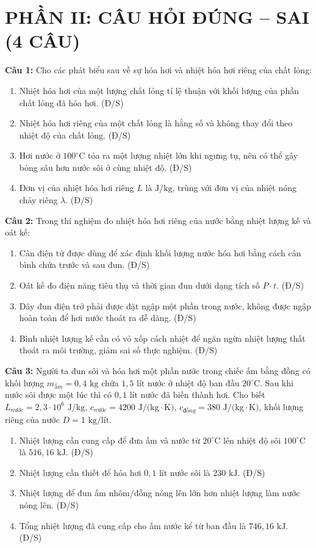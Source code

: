 \documentclass[12pt,a4paper]{article}
\begin{document}
\section*{PHẦN II: CÂU HỎI ĐÚNG -- SAI (4 CÂU)}

\textbf{Câu 1:} Cho các phát biểu sau về sự hóa hơi và nhiệt hóa hơi riêng của chất lỏng:
\begin{enumerate}[label=\alph*.]
  \item Nhiệt hóa hơi của một lượng chất lỏng tỉ lệ thuận với khối lượng của phần chất lỏng đã hóa hơi. \hfill (Đ/S)
  \item Nhiệt hóa hơi riêng của một chất lỏng là hằng số và không thay đổi theo nhiệt độ của chất lỏng. \hfill (Đ/S)
  \item Hơi nước ở $100^{\circ}\text{C}$ tỏa ra một lượng nhiệt lớn khi ngưng tụ, nên có thể gây bỏng sâu hơn nước sôi ở cùng nhiệt độ. \hfill (Đ/S)
  \item Đơn vị của nhiệt hóa hơi riêng $L$ là $\text{J/kg}$, trùng với đơn vị của nhiệt nóng chảy riêng $\lambda$. \hfill (Đ/S)
\end{enumerate}

\textbf{Câu 2:} Trong thí nghiệm đo nhiệt hóa hơi riêng của nước bằng nhiệt lượng kế và oát kế:
\begin{enumerate}[label=\alph*.]
  \item Cân điện tử được dùng để xác định khối lượng nước hóa hơi bằng cách cân bình chứa trước và sau đun. \hfill (Đ/S)
  \item Oát kế đo điện năng tiêu thụ và thời gian đun dưới dạng tích số $P \cdot t$. \hfill (Đ/S)
  \item Dây đun điện trở phải được đặt ngập một phần trong nước, không được ngập hoàn toàn để hơi nước thoát ra dễ dàng. \hfill (Đ/S)
  \item Bình nhiệt lượng kế cần có vỏ xốp cách nhiệt để ngăn ngừa nhiệt lượng thất thoát ra môi trường, giảm sai số thực nghiệm. \hfill (Đ/S)
\end{enumerate}

\textbf{Câu 3:} Người ta đun sôi và hóa hơi một phần nước trong chiếc ấm bằng đồng có khối lượng $m_{ấm} = 0{,}4\text{ kg}$ chứa $1{,}5\text{ lít}$ nước ở nhiệt độ ban đầu $20^{\circ}\text{C}$. Sau khi nước sôi được một lúc thì có $0{,}1\text{ lít}$ nước đã biến thành hơi. Cho biết $L_{nước} = 2{,}3 \cdot 10^6\text{ J/kg}$, $c_{nước} = 4200\text{ J/(kg}\cdot\text{K)}$, $c_{đồng} = 380\text{ J/(kg}\cdot\text{K)}$, khối lượng riêng của nước $D = 1\text{ kg/lít}$.
\begin{enumerate}[label=\alph*.]
  \item Nhiệt lượng cần cung cấp để đưa ấm và nước từ $20^{\circ}\text{C}$ lên nhiệt độ sôi $100^{\circ}\text{C}$ là $516{,}16\text{ kJ}$. \hfill (Đ/S)
  \item Nhiệt lượng cần thiết để hóa hơi $0{,}1\text{ lít}$ nước sôi là $230\text{ kJ}$. \hfill (Đ/S)
  \item Nhiệt lượng để đun ấm nhôm/đồng nóng lên lớn hơn nhiệt lượng làm nước nóng lên. \hfill (Đ/S)
  \item Tổng nhiệt lượng đã cung cấp cho ấm nước kể từ ban đầu là $746{,}16\text{ kJ}$. \hfill (Đ/S)
\end{enumerate}
\end{document}

